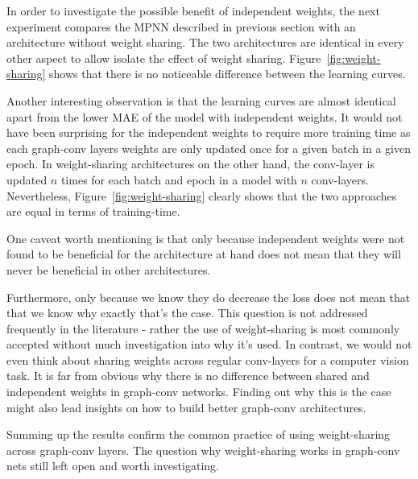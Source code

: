 In order to investigate the possible benefit of independent weights, the next experiment compares the MPNN described in previous section with an architecture without weight sharing. The two architectures are identical in every other aspect to allow isolate the effect of weight sharing. Figure~\ref{fig:weight-sharing} shows that there is no noticeable difference between the learning curves.

Another interesting observation is that the learning curves are almost identical apart from the lower MAE of the model with independent weights. It would not have been surprising for the independent weights to require more training time as each graph-conv layers weights are only updated once for a given batch in a given epoch. In weight-sharing architectures on the other hand, the conv-layer is updated $n$ times for each batch and epoch in a model with $n$ conv-layers. Nevertheless, Figure~\ref{fig:weight-sharing} clearly shows that the two approaches are equal in terms of training-time.


One caveat worth mentioning is that only because independent weights were not found to be beneficial for the architecture at hand does not mean that they will never be beneficial in other architectures.

Furthermore, only because we know they do decrease the loss does not mean that that we know why exactly that's the case. This question is not addressed frequently in the literature - rather the use of weight-sharing is most commonly accepted without much investigation into why it's used. In contrast, we would not even think about sharing weights across regular conv-layers for a computer vision task. It is far from obvious why there is no difference between shared and independent weights in graph-conv networks. Finding out why this is the case might also lead insights on how to build better graph-conv architectures.  

Summing up the results confirm the common practice of using weight-sharing across graph-conv layers. The question why weight-sharing works in graph-conv nets still left open and worth investigating.




